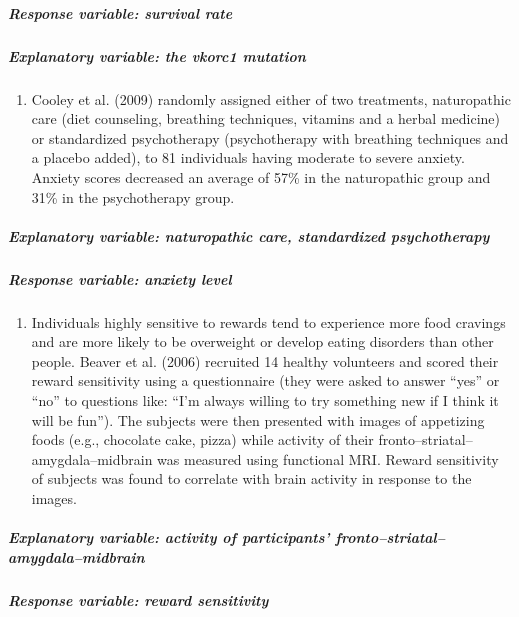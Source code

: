 \documentclass[]{article}
\providecommand{\tightlist}{%
  \setlength{\itemsep}{0pt}\setlength{\parskip}{0pt}}
\let\oldsubparagraph\subparagraph
\renewcommand{\subparagraph}[1]{\oldsubparagraph{#1}\mbox{}}
\begin{document}
\subparagraph{Response variable: survival
rate}\label{response-variable-survival-rate}

\subparagraph{Explanatory variable: the vkorc1
mutation}\label{explanatory-variable-the-vkorc1-mutation}

\begin{enumerate}
\def\labelenumi{\alph{enumi}.}
\setcounter{enumi}{1}
\tightlist
\item
  Cooley et al. (2009) randomly assigned either of two treatments,
  naturopathic care (diet counseling, breathing techniques, vitamins and
  a herbal medicine) or standardized psychotherapy (psychotherapy with
  breathing techniques and a placebo added), to 81 individuals having
  moderate to severe anxiety. Anxiety scores decreased an average of
  57\% in the naturopathic group and 31\% in the psychotherapy group.
\end{enumerate}

\subparagraph{Explanatory variable: naturopathic care, standardized
psychotherapy}\label{explanatory-variable-naturopathic-care-standardized-psychotherapy}

\subparagraph{Response variable: anxiety
level}\label{response-variable-anxiety-level}

\begin{enumerate}
\def\labelenumi{\alph{enumi}.}
\setcounter{enumi}{2}
\tightlist
\item
  Individuals highly sensitive to rewards tend to experience more food
  cravings and are more likely to be overweight or develop eating
  disorders than other people. Beaver et al. (2006) recruited 14 healthy
  volunteers and scored their reward sensitivity using a questionnaire
  (they were asked to answer ``yes'' or ``no'' to questions like: ``I'm
  always willing to try something new if I think it will be fun''). The
  subjects were then presented with images of appetizing foods (e.g.,
  chocolate cake, pizza) while activity of their
  fronto--striatal--amygdala--midbrain was measured using functional
  MRI. Reward sensitivity of subjects was found to correlate with brain
  activity in response to the images.
\end{enumerate}

\subparagraph{Explanatory variable: activity of participants'
fronto--striatal--amygdala--midbrain}\label{explanatory-variable-activity-of-participants-frontostriatalamygdalamidbrain}

\subparagraph{Response variable: reward
sensitivity}\label{response-variable-reward-sensitivity}
\end{document}
